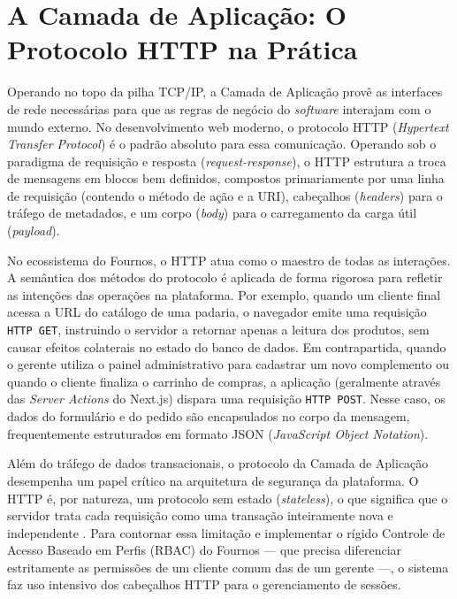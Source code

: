 \documentclass[12pt, a4paper]{article}
\begin{document}
\section{A Camada de Aplicação: O Protocolo HTTP na Prática}

Operando no topo da pilha TCP/IP, a Camada de Aplicação provê as interfaces de rede necessárias para que as regras de negócio do \textit{software} interajam com o mundo externo. No desenvolvimento web moderno, o protocolo HTTP (\textit{Hypertext Transfer Protocol}) é o padrão absoluto para essa comunicação. Operando sob o paradigma de requisição e resposta (\textit{request-response}), o HTTP estrutura a troca de mensagens em blocos bem definidos, compostos primariamente por uma linha de requisição (contendo o método de ação e a URI), cabeçalhos (\textit{headers}) para o tráfego de metadados, e um corpo (\textit{body}) para o carregamento da carga útil (\textit{payload}).

No ecossistema do Fournos, o HTTP atua como o maestro de todas as interações. A semântica dos métodos do protocolo é aplicada de forma rigorosa para refletir as intenções das operações na plataforma. Por exemplo, quando um cliente final acessa a URL do catálogo de uma padaria, o navegador emite uma requisição \texttt{HTTP GET}, instruindo o servidor a retornar apenas a leitura dos produtos, sem causar efeitos colaterais no estado do banco de dados. Em contrapartida, quando o gerente utiliza o painel administrativo para cadastrar um novo complemento ou quando o cliente finaliza o carrinho de compras, a aplicação (geralmente através das \textit{Server Actions} do Next.js) dispara uma requisição \texttt{HTTP POST}. Nesse caso, os dados do formulário e do pedido são encapsulados no corpo da mensagem, frequentemente estruturados em formato JSON (\textit{JavaScript Object Notation}).

Além do tráfego de dados transacionais, o protocolo da Camada de Aplicação desempenha um papel crítico na arquitetura de segurança da plataforma. O HTTP é, por natureza, um protocolo sem estado (\textit{stateless}), o que significa que o servidor trata cada requisição como uma transação inteiramente nova e independente \cite{mdn-http}. Para contornar essa limitação e implementar o rígido Controle de Acesso Baseado em Perfis (RBAC) do Fournos --- que precisa diferenciar estritamente as permissões de um cliente comum das de um gerente ---, o sistema faz uso intensivo dos cabeçalhos HTTP para o gerenciamento de sessões. 
\end{document}
